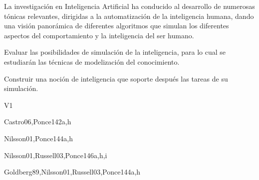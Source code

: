 \begin{syllabus}


\begin{justification}
La investigación en Inteligencia Artificial ha conducido al desarrollo de
numerosas tónicas relevantes, dirigidas a la automatización de la
inteligencia humana, dando una visión panorámica de diferentes
algoritmos que simulan los diferentes aspectos del comportamiento
y la inteligencia del ser humano.
\end{justification}

\begin{goals}
\item Evaluar las posibilidades de simulación de la inteligencia, para lo cual se estudiarán las técnicas de modelización del conocimiento.
\item Construir una noción de inteligencia que soporte después las tareas de su simulación.
\end{goals}

\begin{outcomes}{V1}
    \item {}
    \item {}
    \item {}
    \item {}
\end{outcomes}

\begin{unit}{\ISFundamentalIssues}{}{Castro06,Ponce14}{2}{a,h}
    \ISFundamentalIssuesAllTopics
    \ISFundamentalIssuesAllLearningOutcomes
\end{unit}

\begin{unit}{\ISBasicSearchStrategies}{}{Nilsson01,Ponce14}{4}{a,h}
    \ISBasicSearchStrategiesAllTopics
    \ISBasicSearchStrategiesAllLearningOutcomes
\end{unit}

\begin{unit}{\ISBasicKnowledgeRepresentationandReasoning}{}{Nilsson01,Russell03,Ponce14}{6}{a,h,i}
    \ISBasicKnowledgeRepresentationandReasoningAllTopics
    \ISBasicKnowledgeRepresentationandReasoningAllLearningOutcomes
\end{unit}

\begin{unit}{\ISAdvancedSearch}{}{Goldberg89,Nilsson01,Russell03,Ponce14}{4}{a,h}
    \ISAdvancedSearchAllTopics
    \ISAdvancedSearchAllLearningOutcomes
\end{unit}


\end{syllabus}
